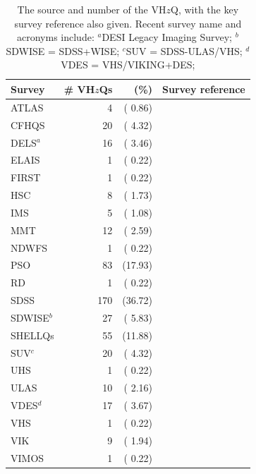 \documentclass[usenatbib]{mnras}
\begin{document}
\begin{table}
\begin{tabular}{l r r l}
\hline  \hline
Survey              & \# VH$z$Qs & (\%) & Survey reference  \\
\hline  
  ATLAS             &     4    &   ( 0.86)    &  \citet{Shanks2015} \\
  CFHQS            &   20    &   ( 4.32)    &  \citet{Willott2007} \\
  DELS$^{a}$       &   16    &   ( 3.46)    &  \citet{Dey2018} \\
  ELAIS              &     1    &   ( 0.22)    &  \citet{Vaisanen2000} \\
  FIRST              &     1    &   ( 0.22)    &  \citet{Becker1995} \\
  HSC                 &    8    &   ( 1.73)    & \citet{Miyazaki2018} \\
  IMS                 &     5    &   ( 1.08)     &  \citet{Kim2015} \\
  MMT               &   12    &   ( 2.59)     &  \citet{McGreer2013} \\
  NDWFS           &     1    &   ( 0.22)    &  \citet{JD1999} \\
  PSO                 &   83   &   (17.93)   &   \citet{Kaiser2002, Kaiser2010} \\
  RD                   &     1   &   ( 0.22)    &  \citet{Mahabal2005} \\
  SDSS                &  170  &    (36.72)    & \citet{EDR} \\
 SDWISE$^{b}$    &   27    &  ( 5.83)    &   \citet{WangF2016} \\
  SHELLQs         &    55    &   (11.88)  &  \citet{Matsuoka2016}     \\  
  SUV$^{c}$       &   20     &    ( 4.32)  & \citet{YangJ2017} \\
  UHS               &    1      &  ( 0.22)     &  \citet{WangF2017} \\
  ULAS               &   10   &   ( 2.16)     & \citet{Lawrence2007} \\
  VDES$^{d}$       &   17  &    ( 3.67)     &  \citet{Reed2017} \\
  VHS                 &     1  &     ( 0.22)    & \citet{WangF2018b} \\
  VIK                 &     9    &  ( 1.94)    &  \citet{Edge2013} \\
  VIMOS           &    1      &  ( 0.22)     &   \citet{LeFevre2003} \\
\hline  \hline
\end{tabular}
\caption{The source and number of the VH$z$Q, with the key survey reference also given. 
  Recent survey name and acronyms include: 
  $^{a}$DESI Legacy Imaging Survey; 
  $^{b}$SDWISE = SDSS+WISE; 
  $^{c}$SUV  = SDSS-ULAS/VHS; 
  $^{d}$VDES = VHS/VIKING+DES; 
}
      \label{tab:surveys}
\end{table}
\end{document}
